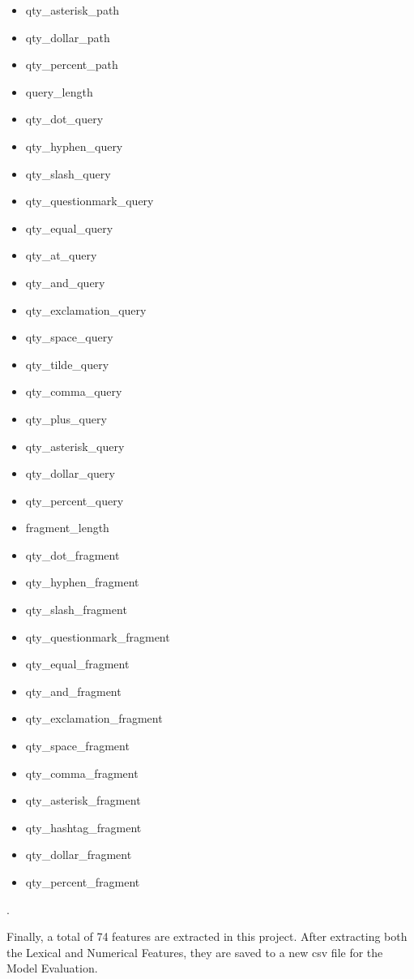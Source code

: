{\begin{multicols}{3}
\begin{itemize}
\item qty\_asterisk\_path
\item qty\_dollar\_path
\item qty\_percent\_path
\item query\_length
\item qty\_dot\_query
\item qty\_hyphen\_query
\item qty\_slash\_query
\item qty\_questionmark\_query
\item qty\_equal\_query
\item qty\_at\_query
\item qty\_and\_query
\item qty\_exclamation\_query
\item qty\_space\_query
\item qty\_tilde\_query
\item qty\_comma\_query
\item qty\_plus\_query
\item qty\_asterisk\_query
\item qty\_dollar\_query
\item qty\_percent\_query
\item fragment\_length
\item qty\_dot\_fragment
\item qty\_hyphen\_fragment
\item qty\_slash\_fragment
\item qty\_questionmark\_fragment
\item qty\_equal\_fragment
\item qty\_and\_fragment
\item qty\_exclamation\_fragment
\item qty\_space\_fragment
\item qty\_comma\_fragment
\item qty\_asterisk\_fragment
\item qty\_hashtag\_fragment
\item qty\_dollar\_fragment
\item qty\_percent\_fragment
\end{itemize}.
\end{multicols}
}
\par Finally, a total of 74 features are extracted in this project. After extracting both the Lexical and Numerical Features, they are saved to a new csv file for the Model Evaluation.
